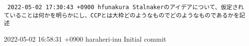 \begin{flushleft}
\tt
2022-05-02 17:30:43 +0900 hfunakura Stalnakerのアイデアについて、仮定されていることは何かを明らかにし、CCPとは大枠どのようなものでどのようなものであるかを記述

2022-05-02 16:58:31 +0900 haraheri-inu Initial commit

\end{flushleft}

